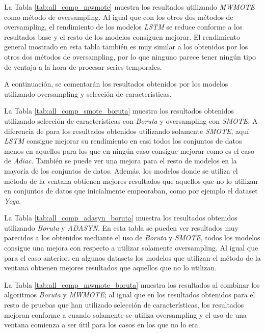 La Tabla \ref{tab:all_comp_mwmote} muestra los resultados utilizando \textit{MWMOTE} como método de oversampling. Al igual que con los otros dos métodos de oversampling, el rendimiento de los modelos \textit{LSTM} se reduce conforme a los resultados base y el resto de los modelos consiguen mejorar. El rendimiento general mostrado en esta tabla también es muy similar a los obtenidos por los otros dos métodos de oversampling, por lo que ninguno parece tener ningún tipo de ventaja a la hora de procesar series temporales. \newline

A continuación, se comentarán los resultados obtenidos por los modelos utilizando oversampling y selección de características.\newline

La Tabla \ref{tab:all_comp_smote_boruta} muestra los resultados obtenidos utilizando selección de características con \textit{Boruta} y oversampling con \textit{SMOTE}. A diferencia de para los resultados obtenidos utilizando solamente \textit{SMOTE}, aquí \textit{LSTM} consigue mejorar su rendimiento en casi todos los conjuntos de datos menos en aquellos para los que en ningún caso consigue mejorar como es el caso de \textit{Adiac}. También se puede ver una mejora para el resto de modelos en la mayoría de los conjuntos de datos. Además, los modelos donde se utiliza el método de la ventana obtienen mejores resultados que aquellos que no lo utilizan en conjuntos de datos que inicialmente empeoraban, como por ejemplo el dataset \textit{Yoga}.\newline

La Tabla \ref{tab:all_comp_adasyn_boruta} muestra los resultados obtenidos utilizando \textit{Boruta} y \textit{ADASYN}. En esta tabla se pueden ver resultados muy parecidos a los obtenidos mediante el uso de \textit{Boruta} y \textit{SMOTE}, todos los modelos consigue una mejora con respecto a utilizar solamente oversampling. Al igual que para el caso anterior, en algunos datasets los modelos que utilizan el método de la ventana obtienen mejores resultados que aquellos que no lo utilizan.\newline

La Tabla \ref{tab:all_comp_mwmote_boruta} muestra los resultados al combinar los algoritmos \textit{Boruta} y \textit{MWMOTE}; al igual que en los resultados obtenidos para el resto de pruebas que han utilizado selección de características, los resultados mejoran conforme a cuando solamente se utiliza oversampling y el uso de una ventana comienza a ser útil para los casos en los que no lo era.

